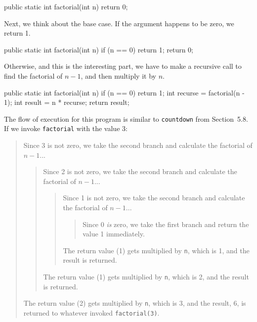 \documentclass[12pt]{book}
\theoremstyle{exercise}
\newcommand{\java}[1]{\verb"#1"}
\newcommand{\java}[1]{\lstinline{#1}} %
\begin{document}
\begin{code}
    public static int factorial(int n) {
        return 0;
    }
\end{code}

Next, we think about the base case.
If the argument happens to be zero, we return 1.

\begin{code}
    public static int factorial(int n) {
        if (n == 0) {
            return 1;
        }
        return 0;
    }
\end{code}

Otherwise, and this is the interesting part, we have to make a recursive call to find the factorial of $n-1$, and then multiply it by $n$.

\begin{code}
    public static int factorial(int n) {
        if (n == 0) {
            return 1;
        }
        int recurse = factorial(n - 1);
        int result = n * recurse;
        return result;
    }
\end{code}

The flow of execution for this program is similar to \java{countdown} from Section~5.8.
If we invoke \java{factorial} with the value 3:

\vspace{-1ex}
\begin{quote}
Since 3 is not zero, we take the second branch and calculate the factorial of $n-1$...
\begin{quote}
Since 2 is not zero, we take the second branch and calculate the factorial of $n-1$...
\begin{quote}
Since 1 is not zero, we take the second branch and calculate the factorial of $n-1$...
\begin{quote}
Since 0 {\em is} zero, we take the first branch and return the value 1 immediately.
\end{quote}
The return value (1) gets multiplied by \java{n}, which is 1, and the result is returned.
\end{quote}
The return value (1) gets multiplied by \java{n}, which is 2, and the result is returned.
\end{quote}
The return value (2) gets multiplied by \java{n}, which is 3, and the result, 6, is returned to whatever invoked \java{factorial(3)}.
\end{quote}
\vspace{-1ex}

\end{document}
